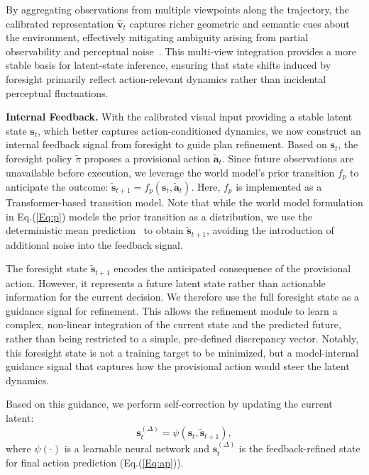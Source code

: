 \documentclass{article}
\theoremstyle{plain}
\theoremstyle{definition}
\theoremstyle{remark}
\begin{document}
By aggregating observations from multiple viewpoints along the trajectory, the calibrated representation $\hat{\boldsymbol{v}}_t$ captures richer geometric and semantic cues about the environment, effectively mitigating ambiguity arising from partial observability and perceptual noise~\cite{arandjelovic2016netvlad}. This multi-view integration provides a more stable basis for latent-state inference, ensuring that state shifts induced by foresight primarily reflect action-relevant dynamics rather than incidental perceptual fluctuations.




\noindent\textbf{Internal Feedback.}
With the calibrated visual input providing a stable latent state $\boldsymbol{s}_t$, which better captures action-conditioned dynamics, we now construct an internal feedback signal from foresight to guide plan refinement.
Based on $\boldsymbol{s}_t$, the foresight policy $\tilde{\pi}$ proposes a provisional action $\tilde{\boldsymbol{a}}_t$.
Since future observations are unavailable before execution, we leverage the world model's prior transition $f_p$ to anticipate the outcome:
$\tilde{\boldsymbol{s}}_{t+1} = f_{p}(\boldsymbol{s}_t, \tilde{\boldsymbol{a}}_t).$
Here, $f_p$ is implemented as a Transformer-based transition model.
Note that while the world model formulation in Eq.(\ref{Eq:p}) models the prior transition as a distribution, we use the deterministic mean prediction~\cite{min2024driveworld} to obtain $\tilde{\boldsymbol{s}}_{t+1}$, avoiding the introduction of additional noise into the feedback signal.

The foresight state $\tilde{\boldsymbol{s}}_{t+1}$ encodes the anticipated consequence of the provisional action.
However, it represents a future latent state rather than actionable information for the current decision.
We therefore use the full foresight state as a guidance signal for refinement. This allows the refinement module to learn a complex, non-linear integration of the current state and the predicted future, rather than being restricted to a simple, pre-defined discrepancy vector.
Notably, this foresight state is not a training target to be minimized, but a model-internal guidance signal that captures how the provisional action would steer the latent dynamics. 


Based on this guidance, we perform self-correction by updating the current latent:
\begin{equation}\label{eq:psi}
\boldsymbol{s}_t^{(\Delta)} = \psi(\boldsymbol{s}_t, \boldsymbol{\tilde{s}}_{t+1}), %
\end{equation}
where $\psi(\cdot)$ is a learnable neural network and $\boldsymbol{s}_t^{(\Delta)}$ is the feedback-refined state for final action prediction (Eq.(\ref{Eq:ap})).
\end{document}
